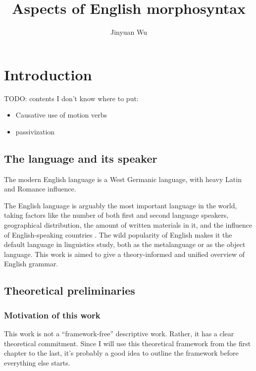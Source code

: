 \documentclass[UTF8, a4paper, oneside, scheme=plain]{ctexrep}
\title{Aspects of English morphosyntax}
\author{Jinyuan Wu}
\newcommand*{\citepage}[1]{p.~{#1}}
\begin{document}
    
\maketitle

\automath

\tableofcontents

\chapter{Introduction}

\setcounter{page}{1}

TODO: contents I don't know where to put:
\begin{itemize}
    \item Causative use of motion verbs \citep[\citepage{103}]{dixon2005semantic}
    \item passivization
\end{itemize}

\section{The language and its speaker}

The modern English language is a West Germanic language,
with heavy Latin and Romance influence. 

The English language is arguably the most important language in the world,
taking factors like the number of both first and second language speakers,
geographical distribution,
the amount of written materials in it,
and the influence of English-speaking countries \citep[\citepage{3}]{quirk1985}.
The wild popularity of English 
makes it the default language in linguistics study,
both as the metalanguage or as the object language.
This work is aimed to give a theory-informed and unified overview of English grammar.


\section{Theoretical preliminaries}

\subsection{Motivation of this work}

This work is not a ``framework-free'' descriptive work.
Rather, it has a clear theoretical commitment.
Since I will use this theoretical framework from the first chapter to the last,
it's probably a good idea to outline the framework before everything else starts.
\end{document}
